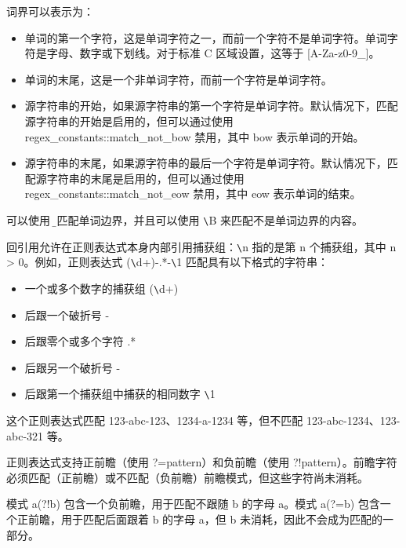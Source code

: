 
词界可以表示为：

\begin{itemize}
\item
单词的第一个字符，这是单词字符之一，而前一个字符不是单词字符。单词字符是字母、数字或下划线。对于标准 C 区域设置，这等于 [A-Za-z0-9\_]。

\item
单词的末尾，这是一个非单词字符，而前一个字符是单词字符。

\item
源字符串的开始，如果源字符串的第一个字符是单词字符。默认情况下，匹配源字符串的开始是启用的，但可以通过使用 regex\_constants::match\_not\_bow 禁用，其中 bow 表示单词的开始。

\item
源字符串的末尾，如果源字符串的最后一个字符是单词字符。默认情况下，匹配源字符串的末尾是启用的，但可以通过使用 regex\_constants::match\_not\_eow 禁用，其中 eow 表示单词的结束。
\end{itemize}

可以使用 \b 来匹配单词边界，并且可以使用 \verb|\|B 来匹配不是单词边界的内容。


回引用允许在正则表达式本身内部引用捕获组：\verb|\|n 指的是第 n 个捕获组，其中 n > 0。例如，正则表达式 (\verb|\|d+)-.*-\verb|\|1 匹配具有以下格式的字符串：

\begin{itemize}
\item
一个或多个数字的捕获组 (\verb|\|d+)

\item
后跟一个破折号 -

\item
后跟零个或多个字符 .*

\item
后跟另一个破折号 -

\item
后跟第一个捕获组中捕获的相同数字 \verb|\|1
\end{itemize}

这个正则表达式匹配 123-abc-123、1234-a-1234 等，但不匹配 123-abc-1234、123-abc-321 等。


正则表达式支持正前瞻（使用 ?=pattern）和负前瞻（使用 ?!pattern）。前瞻字符必须匹配（正前瞻）或不匹配（负前瞻）前瞻模式，但这些字符尚未消耗。

模式 a(?!b) 包含一个负前瞻，用于匹配不跟随 b 的字母 a。模式 a(?=b) 包含一个正前瞻，用于匹配后面跟着 b 的字母 a，但 b 未消耗，因此不会成为匹配的一部分。

